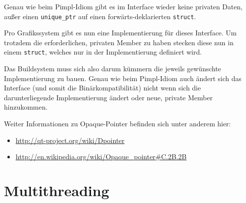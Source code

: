 \documentclass[12pt, a4paper, titlepage, hidelinks]{scrreprt}
\begin{document}
Genau wie beim Pimpl-Idiom gibt es im Interface wieder keine privaten Daten, außer einen \texttt{unique\_ptr} auf einen forwärts-deklarierten \texttt{struct}.


Pro Grafikssystem gibt es nun eine Implementierung für dieses Interface. Um trotzdem die erforderlichen, privaten Member zu haben stecken diese nun in einem \texttt{struct}, welches nur in der Implementierung definiert wird.


Das Buildsystem muss sich also darum kümmern die jeweils gewünschte Implementierung zu bauen. Genau wie beim Pimpl-Idiom auch ändert sich das Interface (und somit die Binärkompatibilität) nicht wenn sich die darunterliegende Implementierung ändert oder neue, private Member hinzukommen.

Weiter Informationen zu Opaque-Pointer befinden sich unter anderem hier:
\begin{itemize}
\item \url{http://qt-project.org/wiki/Dpointer}
\item \url{http://en.wikipedia.org/wiki/Opaque_pointer#C.2B.2B}
\end{itemize}

\section{Multithreading}
\end{document}
